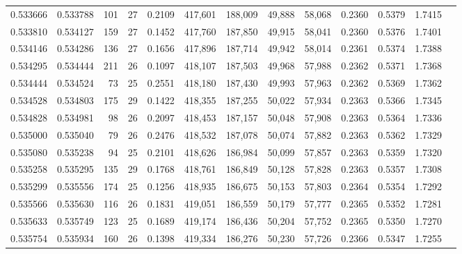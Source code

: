 \begin{tabular}{rrrrrrrrrrrrr}
0.533666 & 0.533788 &    101 &    27 &                                     0.2109 & 417,601 & 188,009 &  49,888 &  58,068 & 0.2360 & 0.5379 & 1.7415 \\
0.533810 & 0.534127 &    159 &    27 &                                     0.1452 & 417,760 & 187,850 &  49,915 &  58,041 & 0.2360 & 0.5376 & 1.7401 \\
0.534146 & 0.534286 &    136 &    27 &                                     0.1656 & 417,896 & 187,714 &  49,942 &  58,014 & 0.2361 & 0.5374 & 1.7388 \\
0.534295 & 0.534444 &    211 &    26 &                                     0.1097 & 418,107 & 187,503 &  49,968 &  57,988 & 0.2362 & 0.5371 & 1.7368 \\
0.534444 & 0.534524 &     73 &    25 &                                     0.2551 & 418,180 & 187,430 &  49,993 &  57,963 & 0.2362 & 0.5369 & 1.7362 \\
0.534528 & 0.534803 &    175 &    29 &                                     0.1422 & 418,355 & 187,255 &  50,022 &  57,934 & 0.2363 & 0.5366 & 1.7345 \\
0.534828 & 0.534981 &     98 &    26 &                                     0.2097 & 418,453 & 187,157 &  50,048 &  57,908 & 0.2363 & 0.5364 & 1.7336 \\
0.535000 & 0.535040 &     79 &    26 &                                     0.2476 & 418,532 & 187,078 &  50,074 &  57,882 & 0.2363 & 0.5362 & 1.7329 \\
0.535080 & 0.535238 &     94 &    25 &                                     0.2101 & 418,626 & 186,984 &  50,099 &  57,857 & 0.2363 & 0.5359 & 1.7320 \\
0.535258 & 0.535295 &    135 &    29 &                                     0.1768 & 418,761 & 186,849 &  50,128 &  57,828 & 0.2363 & 0.5357 & 1.7308 \\
0.535299 & 0.535556 &    174 &    25 &                                     0.1256 & 418,935 & 186,675 &  50,153 &  57,803 & 0.2364 & 0.5354 & 1.7292 \\
0.535566 & 0.535630 &    116 &    26 &                                     0.1831 & 419,051 & 186,559 &  50,179 &  57,777 & 0.2365 & 0.5352 & 1.7281 \\
0.535633 & 0.535749 &    123 &    25 &                                     0.1689 & 419,174 & 186,436 &  50,204 &  57,752 & 0.2365 & 0.5350 & 1.7270 \\
0.535754 & 0.535934 &    160 &    26 &                                     0.1398 & 419,334 & 186,276 &  50,230 &  57,726 & 0.2366 & 0.5347 & 1.7255 \\

\end{tabular}
